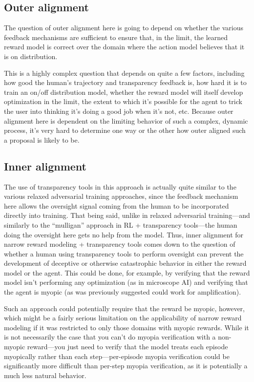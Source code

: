 \documentclass[
  onecolumn,
  natbib,
]{miri-tech-article}
\begin{document}
\vspace{2mm}

\subsection{Outer alignment} The question of outer alignment here is going to depend on whether the various feedback mechanisms are sufficient to ensure that, in the limit, the learned reward model is correct over the domain where the action model believes that it is on distribution.

This is a highly complex question that depends on quite a few factors, including how good the human's trajectory and transparency feedback is, how hard it is to train an on/off distribution model, whether the reward model will itself develop optimization in the limit, the extent to which it's possible for the agent to trick the user into thinking it's doing a good job when it's not, etc. Because outer alignment here is dependent on the limiting behavior of such a complex, dynamic process, it's very hard to determine one way or the other how outer aligned such a proposal is likely to be.

\subsection{Inner alignment} The use of transparency tools in this approach is actually quite similar to the various relaxed adversarial training approaches, since the feedback mechanism here allows the oversight signal coming from the human to be incorporated directly into training. That being said, unlike in relaxed adversarial training---and similarly to the ``mulligan'' approach in RL + transparency tools---the human doing the oversight here gets no help from the model. Thus, inner alignment for narrow reward modeling + transparency tools comes down to the question of whether a human using transparency tools to perform oversight can prevent the development of deceptive or otherwise catastrophic behavior in either the reward model or the agent. This could be done, for example, by verifying that the reward model isn't performing any optimization (as in microscope AI) and verifying that the agent is myopic (as was previously suggested could work for amplification).

Such an approach could potentially require that the reward be myopic, however, which might be a fairly serious limitation on the applicability of narrow reward modeling if it was restricted to only those domains with myopic rewards. While it is not necessarily the case that you can't do myopia verification with a non-myopic reward---you just need to verify that the model treats each episode myopically rather than each step---per-episode myopia verification could be significantly more difficult than per-step myopia verification, as it is potentially a much less natural behavior.
\end{document}
